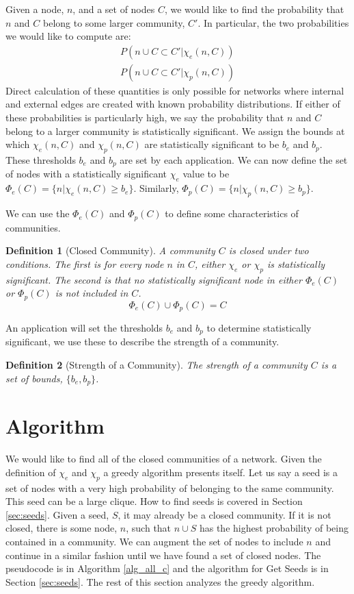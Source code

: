 \documentclass[phd,tocprelim]{cornell}
\newtheorem{definition}{Definition}
\begin{document}
Given a node, $n$, and a set of nodes $C$, we would like to find the probability that $n$ and $C$ belong to some larger community, $C'$.  In particular, the two probabilities we would like to compute are:
\begin{eqnarray*}
 P( n \cup C \subset C'  | \chi_e(n, C)) \\
 P(n \cup C \subset C' | \chi_p(n, C) ) 
\end{eqnarray*}
Direct calculation of these quantities is only possible for networks where internal and external edges are created with known probability distributions.  If either of these probabilities is particularly high, we say the probability that $n$ and $C$ belong to a larger community is statistically significant.  We assign the bounds at which $\chi_e(n, C)$ and $\chi_p(n, C)$ are statistically significant to be $b_e$ and $b_p$.  These thresholds $b_e$ and $b_p$ are set by each application.  We can now define the set of nodes with a statistically significant $\chi_e$ value to be $\Phi_e(C) = \{ n | \chi_e(n, C) \geq b_e\}$.  Similarly, $\Phi_p(C) = \{ n | \chi_p(n, C) \geq b_p\}$.


We can use the $\Phi_e(C)$ and $\Phi_p(C)$ to define some characteristics of communities. 
\begin{definition}[Closed Community]
A community $C$ is closed under two conditions.  The first is for every node $n$ in $C$, either $\chi_e$ or $\chi_p$ is statistically significant.  The second is that no statistically significant node in either $\Phi_e(C)$ or $\Phi_p(C)$ is not included in $C$.
\begin{equation}
\Phi_e(C) \cup \Phi_p(C) = C
\end{equation}
\end{definition}
An application will set the thresholds $b_e$ and $b_p$ to determine statistically significant, we use these to describe the strength of a community.
\begin{definition}[Strength of a Community]
The strength of a community $C$ is a set of bounds, $\{b_e, b_p\}$.
\end{definition}


\section{Algorithm}

We would like to find all of the closed communities of a network.  Given the definition of $\chi_e$ and $\chi_p$ a greedy algorithm presents itself.  Let us say a seed is a set of nodes with a very high probability of belonging to the same community.  This seed can be a large clique.  How to find seeds is covered in Section \ref{sec:seeds}.  Given a seed, $S$, it may already be a closed community.  If it is not closed, there is some node, $n$, such that $n \cup S$ has the highest probability of being contained in a community.  We can augment the set of nodes to include $n$ and continue in a similar fashion until we have found a set of closed nodes.  The pseudocode is in Algorithm \ref{alg_all_c} and the algorithm for {\sc Get Seeds} is in Section \ref{sec:seeds}.  The rest of this section analyzes the greedy algorithm.
\end{document}

